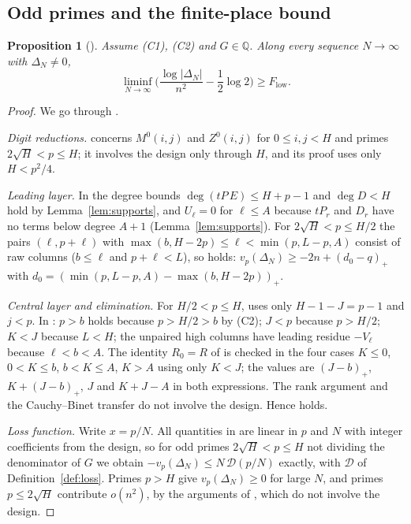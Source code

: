 \documentclass[11pt]{article}
\newtheorem{proposition}[theorem]{Proposition}
\theoremstyle{definition}
\newcommand{\pos}[1]{\left(#1\right)_{+}}
\newcommand{\Dl}{\mathcal{D}}
\begin{document}
\subsection{Odd primes and the finite-place bound}

\begin{proposition}[{\cite[Prop.~3.4]{OAI}}]\label{prop:low}
Assume (C1), (C2) and $G\in\mathbb Q$. Along every sequence $N\to\infty$ with $\Delta_N\ne0$,
\[
\liminf_{N\to\infty}\Big(\frac{\log|\Delta_N|}{n^2}-\frac12\log2\Big)\ge F_{\mathrm{low}}.
\]
\end{proposition}

\begin{proof}
We go through \cite[Sec.~3]{OAI}.

\emph{Digit reductions.} \cite[Lemma~3.1]{OAI} concerns $M^0(i,j)$ and $Z^0(i,j)$ for $0\le i,j<H$ and primes $2\sqrt H<p\le H$; it involves the design only through $H$, and its proof uses only $H<p^2/4$.

\emph{Leading layer.} In \cite[Eqs.~(36)--(37)]{OAI} the degree bounds $\deg(tP\,E)\le H+p-1$ and $\deg D<H$ hold by Lemma~\ref{lem:supports}, and $U_\ell=0$ for $\ell\le A$ because $tP_r$ and $D_r$ have no terms below degree $A+1$ (Lemma~\ref{lem:supports}). For $2\sqrt H<p\le H/2$ the pairs $(\ell,p+\ell)$ with $\max(b,H-2p)\le\ell<\min(p,L-p,A)$ consist of raw columns ($b\le\ell$ and $p+\ell<L$), so \cite[Eq.~(38)]{OAI} holds: $v_p(\Delta_N)\ge-2n+\pos{d_0-q}$ with $d_0=\pos{\min(p,L-p,A)-\max(b,H-2p)}$.

\emph{Central layer and elimination.} For $H/2<p\le H$, \cite[Lemma~3.2]{OAI} uses only $H-1-J=p-1$ and $j<p$. In \cite[Lemma~3.3]{OAI}: $p>b$ holds because $p>H/2>b$ by (C2); $J<p$ because $p>H/2$; $K<J$ because $L<H$; the unpaired high columns have leading residue $-V_\ell$ because $\ell<b<A$. The identity $R_0=R$ of \cite[Eq.~(41)]{OAI} is checked in the four cases $K\le0$, $0<K\le b$, $b<K\le A$, $K>A$ using only $K<J$; the values are $\pos{J-b}$, $K+\pos{J-b}$, $J$ and $K+J-A$ in both expressions. The rank argument and the Cauchy--Binet transfer do not involve the design. Hence \cite[Eq.~(40)]{OAI} holds.

\emph{Loss function.} Write $x=p/N$. All quantities in \cite[Eqs.~(38), (40)]{OAI} are linear in $p$ and $N$ with integer coefficients from the design, so for odd primes $2\sqrt H<p\le H$ not dividing the denominator of $G$ we obtain $-v_p(\Delta_N)\le N\,\Dl(p/N)$ exactly, with $\Dl$ of Definition~\ref{def:loss}. Primes $p>H$ give $v_p(\Delta_N)\ge0$ for large $N$, and primes $p\le2\sqrt H$ contribute $o(n^2)$, by the arguments of \cite[Sec.~3.4]{OAI}, which do not involve the design.


\end{proof}
\end{document}

